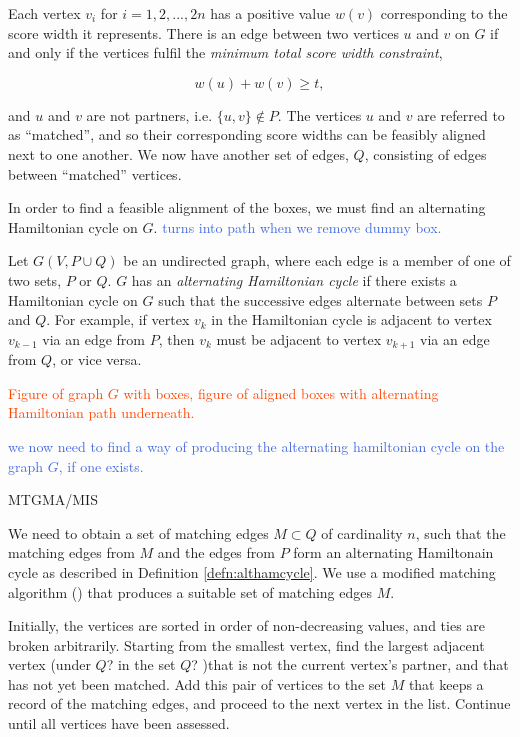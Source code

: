 \documentclass[oribibl]{llncs}
\begin{document}
Each vertex $v_i$ for $i = 1, 2, ..., 2n$ has a positive value $w(v)$ corresponding to the score width it represents. There is an edge between two vertices $u$ and $v$ on $G$ if and only if the vertices fulfil the \textit{minimum total score width constraint}, 

\begin{equation*}
w(u) + w(v) \geq t,
\end{equation*}

and $u$ and $v$ are not partners, i.e. $\{u, v\} \notin P$. The vertices $u$ and $v$ are referred to as \textcolor{OliveGreen}{``matched''}, and so their corresponding score widths can be feasibly aligned next to one another. We now have another set of edges, $Q$, consisting of edges between \textcolor{OliveGreen}{``matched''} vertices.  

In order to find a feasible alignment of the boxes, we must find an alternating Hamiltonian cycle on $G$. \textcolor{RoyalBlue}{turns into path when we remove dummy box.}

\begin{definition}
	\label{defn:althamcycle}
	Let $G(V, P\cup Q)$ be an undirected graph, where each edge is a member of one of two sets, $P$ or $Q$. $G$ has an \textit{alternating Hamiltonian cycle} if there exists a Hamiltonian cycle on $G$ such that the successive edges alternate between sets $P$ and $Q$. For example, if vertex $v_k$ in the Hamiltonian cycle is adjacent to vertex $v_{k-1}$ via an edge from $P$, then $v_k$ must be adjacent to vertex $v_{k+1}$ via an edge from $Q$, or vice versa. 
\end{definition}

\textcolor{OrangeRed}{Figure of graph $G$ with boxes, figure of aligned boxes with alternating Hamiltonian path underneath.}

\textcolor{RoyalBlue}{we now need to find a way of producing the alternating hamiltonian cycle on the graph $G$, if one exists.}

MTGMA/MIS

We need to obtain a set of matching edges $M \subset Q$ of cardinality $n$, such that the matching edges from $M$ and the edges from $P$ form an alternating Hamiltonain cycle as described in Definition \ref{defn:althamcycle}. We use a modified matching algorithm (\citealp{mahadev1994, becker2010}) that produces a suitable set of matching edges $M$. 

Initially, the vertices are sorted in order of non-decreasing values, and ties are broken arbitrarily. Starting from the smallest vertex, find the largest adjacent vertex (under $Q$? in the set $Q$? )that is not the current vertex's partner, and that has not yet been matched. Add this pair of vertices to the set $M$ that keeps a record of the matching edges, and proceed to the next vertex in the list. Continue until all vertices have been assessed. 
\end{document}

